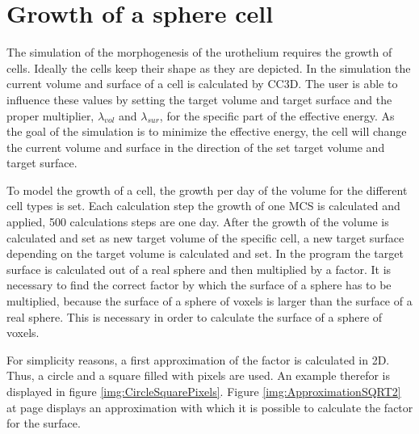 \section{Growth of a sphere cell}\label{sec:GrowSphereCell}
The simulation of the morphogenesis of the urothelium requires the growth of cells. Ideally the cells keep their shape as they are depicted. \newline
In the simulation the current volume and surface of a cell is calculated by \ac{CC3D}. The user is able to influence these values by setting the target volume and target surface and the proper multiplier, $\lambda_{vol}$ and $\lambda_{sur}$, for the specific part of the effective energy. As the goal of the simulation is to minimize the effective energy, the cell will change the current volume and surface in the direction of the set target volume and target surface. 

To model the growth of a cell, the growth per day of the volume for the different cell types is set. Each calculation step the growth of one \ac{MCS} is calculated and applied, 500 calculations steps are one day. After the growth of the volume is calculated and set as new target volume of the specific cell, a new target surface depending on the target volume is calculated and set. \newline
In the program the target surface is calculated out of a real sphere and then multiplied by a factor.
It is necessary to find the correct factor by which the surface of a sphere has to be multiplied, because the surface of a sphere of voxels is larger than the surface of a real sphere. This is necessary in order to calculate the surface of a sphere of voxels. 

For simplicity reasons, a first approximation of the factor is calculated in 2D. Thus, a circle and a square filled with pixels are used. An example therefor is displayed in figure \ref{img:CircleSquarePixels}. \newline
Figure \ref{img:ApproximationSQRT2} at page \pageref{img:ApproximationSQRT2} displays an approximation with which it is possible to calculate the factor for the surface. 

